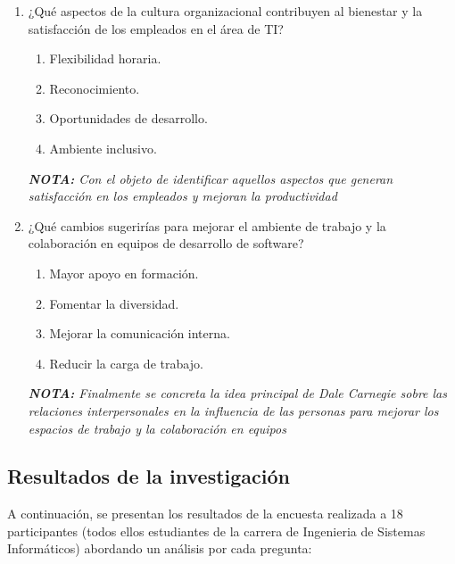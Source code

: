 \documentclass[journal]{IEEEtran}
\begin{document}
\begin{enumerate}
	\item ¿Qué aspectos de la cultura organizacional contribuyen al bienestar y la satisfacción de los empleados en el área de TI?
	\begin{enumerate}
		\item Flexibilidad horaria.
		\item Reconocimiento.
		\item Oportunidades de desarrollo.
		\item Ambiente inclusivo.
	\end{enumerate}
	\textit{\textbf{NOTA:} Con el objeto de identificar aquellos aspectos que generan satisfacción en los empleados y mejoran la productividad}
	
	\item ¿Qué cambios sugerirías para mejorar el ambiente de trabajo y la colaboración en equipos de desarrollo de software?
	\begin{enumerate}
		\item Mayor apoyo en formación.
		\item Fomentar la diversidad.
		\item Mejorar la comunicación interna.
		\item Reducir la carga de trabajo.
	\end{enumerate}
	\textit{\textbf{NOTA:} Finalmente se concreta la idea principal de Dale Carnegie sobre las relaciones interpersonales en la influencia de las personas para mejorar los espacios de trabajo y la colaboración en equipos}
\end{enumerate}

\subsection{Resultados de la investigación}
A continuación, se presentan los resultados de la encuesta realizada a 18 participantes (todos ellos estudiantes de la carrera de Ingenieria de Sistemas Informáticos) abordando un análisis por cada pregunta:
\end{document}
